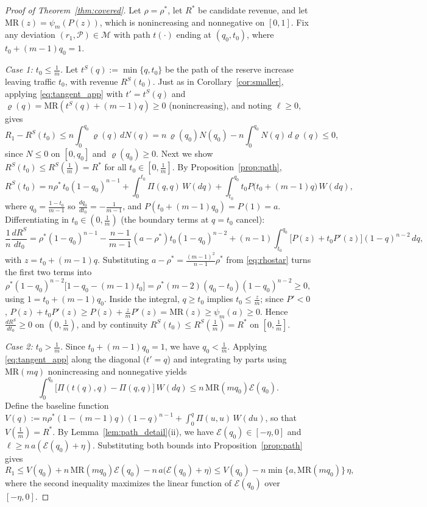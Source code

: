\documentclass[12pt]{article}
\theoremstyle{mystyle}
\theoremstyle{mystyle2}
\newcommand{\M}{\mathcal{M}}
\newcommand{\cP}{\mathcal{P}}
\newcommand{\1}{\mathbf{1}}
\begin{document}
\begin{proof}[Proof of Theorem~\ref{thm:covered}]
Let $\rho=\rho^*$, let $R^*$ be candidate revenue, and let $\mathrm{MR}(z)=\psi_m(P(z))$, which is nonincreasing and nonnegative on $[0,1]$. Fix any deviation $(r_1,\cP)\in\M$ with path $t(\cdot)$ ending at $(q_0,t_0)$, where $t_0+(m-1)q_0=1$.

\emph{Case 1: $t_0\le\frac{1}{m}$.} Let $t^S(q):=\min\{q,t_0\}$ be the path of the reserve increase leaving traffic $t_0$, with revenue $R^S(t_0)$. Just as in Corollary~\ref{cor:smaller}, applying \eqref{eq:tangent_app} with $t'=t^S(q)$ and $\varrho(q)=\mathrm{MR}(t^S(q)+(m-1)q)\ge 0$ (nonincreasing), and noting $\ell\ge 0$, gives
\[
R_1 - R^S(t_0) \le n\int_0^{q_0}\varrho(q)\,dN(q) = n\,\varrho(q_0)N(q_0) - n\int_0^{q_0}N(q)\,d\varrho(q) \le 0,
\]
since $N\le 0$ on $[0,q_0]$ and $\varrho(q_0)\ge 0$. Next we show $R^S(t_0)\le R^S(\frac{1}{m})=R^*$ for all $t_0\in[0,\frac{1}{m}]$. By Proposition~\ref{prop:path},
\[
R^S(t_0) = n\rho^*\,t_0(1-q_0)^{n-1} + \int_0^{t_0}\Pi(q,q)\,W(dq) + \int_{t_0}^{q_0} t_0 P\bigl(t_0+(m-1)q\bigr)\,W(dq),
\]
where $q_0=\frac{1-t_0}{m-1}$ so $\frac{dq_0}{dt_0}=-\frac{1}{m-1}$, and $P(t_0+(m-1)q_0)=P(1)=a$. Differentiating in $t_0\in(0,\frac{1}{m})$ (the boundary terms at $q=t_0$ cancel):
\[
\frac{1}{n}\frac{dR^S}{dt_0} = \rho^*(1-q_0)^{n-1} - \frac{n-1}{m-1}(a-\rho^*)t_0(1-q_0)^{n-2} + (n-1)\int_{t_0}^{q_0}\bigl[P(z)+t_0 P'(z)\bigr](1-q)^{n-2}\,dq,
\]
with $z=t_0+(m-1)q$. Substituting $a-\rho^*=\frac{(m-1)^2}{n-1}\rho^*$ from \eqref{eq:rhostar} turns the first two terms into
\[
\rho^*(1-q_0)^{n-2}\bigl[1-q_0-(m-1)t_0\bigr] = \rho^*(m-2)(q_0-t_0)(1-q_0)^{n-2} \ge 0,
\]
using $1=t_0+(m-1)q_0$. Inside the integral, $q\ge t_0$ implies $t_0\le\frac{z}{m}$; since $P'<0$, $P(z)+t_0 P'(z)\ge P(z)+\frac{z}{m}P'(z)=\mathrm{MR}(z)\ge\psi_m(a)\ge 0$. Hence $\frac{dR^S}{dt_0}\ge 0$ on $(0,\frac{1}{m})$, and by continuity $R^S(t_0)\le R^S(\frac{1}{m})=R^*$ on $[0,\frac{1}{m}]$.

\emph{Case 2: $t_0>\frac{1}{m}$.} Since $t_0+(m-1)q_0=1$, we have $q_0<\frac{1}{m}$. Applying \eqref{eq:tangent_app} along the diagonal ($t'=q$) and integrating by parts using $\mathrm{MR}(mq)$ nonincreasing and nonnegative yields
\[
\int_0^{q_0}\bigl[\Pi(t(q),q)-\Pi(q,q)\bigr]\,W(dq) \le n\,\mathrm{MR}(mq_0)\mathcal E(q_0).
\]
Define the baseline function $V(q):=n\rho^*(1-(m-1)q)(1-q)^{n-1}+\int_0^q\Pi(u,u)\,W(du)$, so that $V(\frac{1}{m})=R^*$. By Lemma~\ref{lem:path_detail}(ii), we have $\mathcal E(q_0)\in[-\eta,0]$ and $\ell\ge n\,a(\mathcal E(q_0)+\eta)$. Substituting both bounds into Proposition~\ref{prop:path} gives
\[
R_1 \le V(q_0) + n\,\mathrm{MR}(mq_0)\mathcal E(q_0) - n\,a\bigl(\mathcal E(q_0)+\eta\bigr) \le V(q_0) - n\min\bigl\{a,\mathrm{MR}(mq_0)\bigr\}\,\eta,
\]
where the second inequality maximizes the linear function of $\mathcal E(q_0)$ over $[-\eta,0]$.


\end{proof}
\end{document}
